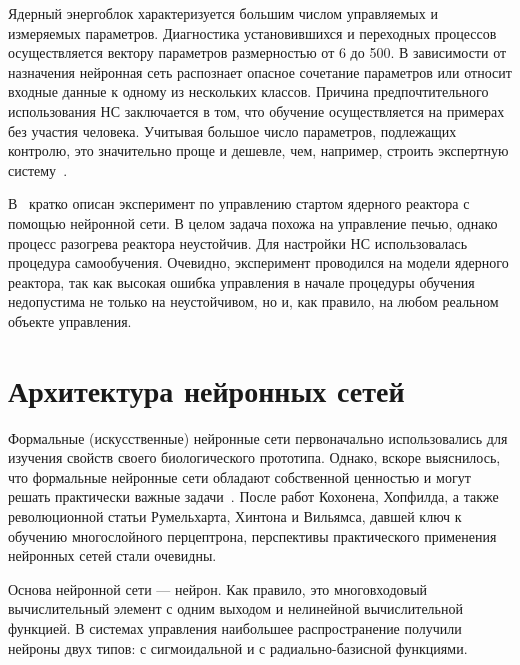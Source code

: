 Ядерный энергоблок характеризуется большим числом управляемых и
измеряемых параметров.  Диагностика установившихся и переходных
процессов осуществляется вектору параметров размерностью от 6 до 500.
В зависимости от назначения нейронная сеть распознает опасное
сочетание параметров или относит входные данные к одному из нескольких
классов.  Причина предпочтительного использования НС заключается в
том, что обучение осуществляется на примерах без участия человека.
Учитывая большое число параметров, подлежащих контролю, это
значительно проще и дешевле, чем, например, строить экспертную
систему~\cite{basubart94}.

В~\cite{uhrig91} кратко описан эксперимент по управлению стартом
ядерного реактора с помощью нейронной сети.  В целом задача похожа на
управление печью, однако процесс разогрева реактора неустойчив.  Для
настройки НС использовалась процедура самообучения.  Очевидно,
эксперимент проводился на модели ядерного реактора, так как высокая
ошибка управления в начале процедуры обучения недопустима не только на
неустойчивом, но и, как правило, на любом реальном объекте управления.

\section{Архитектура нейронных сетей}


Формальные (искусственные) нейронные сети первоначально использовались
для изучения свойств своего биологического прототипа.  Однако, вскоре
выяснилось, что формальные нейронные сети обладают собственной
ценностью и могут решать практически важные задачи~\cite{wasser92}.
После работ Кохонена, Хопфилда, а также революционной статьи
Румельхарта, Хинтона и Вильямса, давшей ключ к обучению многослойного
перцептрона, перспективы практического применения нейронных сетей
стали очевидны.

Основа нейронной сети --- нейрон.  Как правило, это многовходовый
вычислительный элемент с одним выходом и нелинейной вычислительной
функцией.  В системах управления наибольшее распространение получили
нейроны двух типов: с сигмоидальной и с радиально-базисной функциями.

